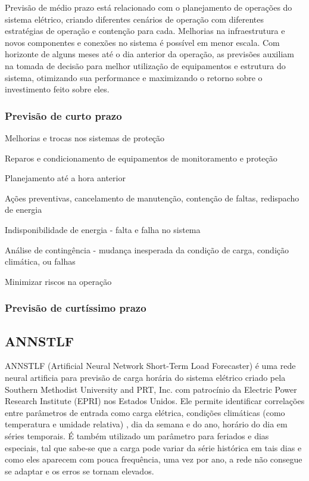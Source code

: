 \documentclass[
	12pt,				%
	oneside,			%
	a4paper,			%
	english,			%
	brazil				%
	]{abntex2}
\begin{document}
	Previsão de médio prazo está relacionado com o planejamento de operações do sistema elétrico, criando diferentes cenários de operação com diferentes estratégias de operação e contenção para cada. Melhorias na infraestrutura e novos componentes e conexões no sistema é possível em menor escala. Com horizonte de alguns meses até o dia anterior da operação, as previsões auxiliam na tomada de decisão para melhor utilização de equipamentos e estrutura do sistema, otimizando sua performance e maximizando o retorno sobre o investimento feito sobre eles. 
	
	
\subsubsection{Previsão de curto prazo}
	


	Melhorias e trocas nos sistemas de proteção
	
	Reparos e condicionamento de equipamentos de monitoramento e proteção
	
	Planejamento até a hora anterior
	
	Ações preventivas, cancelamento de manutenção, contenção de faltas, redispacho de energia
	
	Indisponibilidade de energia - falta e falha no sistema
	
	Análise de contingência - mudança inesperada da condição de carga, condição climática, ou falhas	
	
	Minimizar riscos na operação
	
\subsubsection{Previsão de curtíssimo prazo}
	


\subsection{ANNSTLF}
	ANNSTLF (Artificial Neural Network Short-Term Load Forecaster) é uma rede neural artificia para previsão de carga horária do sistema elétrico criado pela Southern Methodist University and PRT, Inc. com patrocínio da  Electric Power Research Institute (EPRI) nos Estados Unidos. Ele permite identificar correlações entre parâmetros de entrada como carga elétrica, condições climáticas (como temperatura e umidade relativa) , dia da semana e do ano, horário do dia em séries temporais. É também utilizado um parâmetro para feriados e dias especiais, tal que sabe-se que a carga pode variar da série histórica em tais dias e como eles aparecem com pouca frequência, uma vez por ano, a rede não consegue se adaptar e os erros se tornam elevados. \cite{khotanzad1998annstlf}
\end{document}
